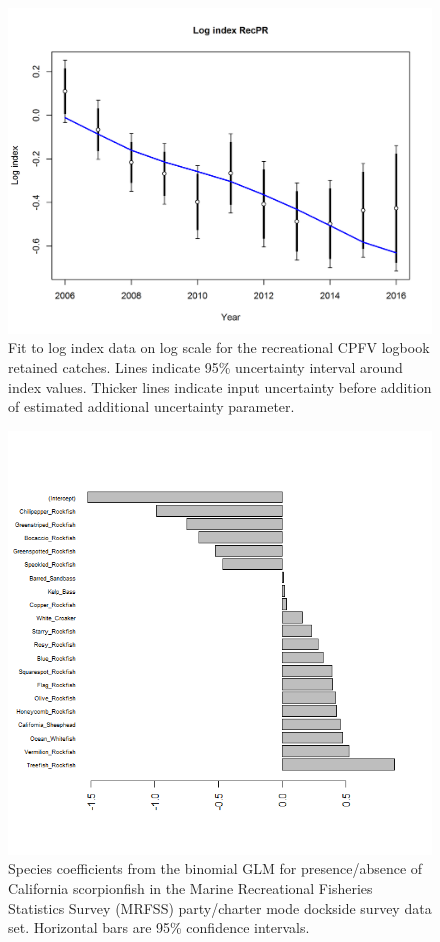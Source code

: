 \documentclass[12pt,]{article}
\begin{document}
\begin{figure}[htbp]
\centering
\includegraphics{r4ss/plots_mod1/index5_logcpuefit_RecPR.png}
\caption{Fit to log index data on log scale for the recreational CPFV
logbook retained catches. Lines indicate 95\% uncertainty interval
around index values. Thicker lines indicate input uncertainty before
addition of estimated additional uncertainty parameter.
\label{fig:index5_logcpuefit_RecPR}}
\end{figure}

\FloatBarrier

\begin{figure}[htbp]
\centering
\includegraphics{Figures/Fleet5_RecPC_dockside_SM.png}
\caption{Species coefficients from the binomial GLM for presence/absence
of California scorpionfish in the Marine Recreational Fisheries
Statistics Survey (MRFSS) party/charter mode dockside survey data set.
Horizontal bars are 95\% confidence intervals.
\label{fig:Fleet5_RecPC_docksideSM}}
\end{figure}
\end{document}
